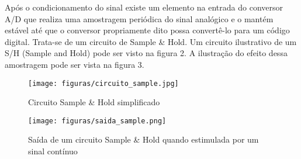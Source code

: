 Após o condicionamento do sinal existe um elemento na entrada do conversor A/D que realiza uma amostragem periódica do sinal analógico e o mantém estável até que o conversor propriamente dito possa convertê-lo para um código digital. Trata-se de um circuito de Sample \& Hold. Um circuito ilustrativo de um S/H (Sample and Hold) pode ser visto na figura 2. A ilustração do efeito dessa amostragem pode ser vista na figura 3\cite{braga2013}.

\begin{figure}[H]
	\centering
	\texttt{[image: figuras/circuito\_sample.jpg]}
	\caption{Circuito Sample \& Hold simplificado} \label{circuito_sample}
\end{figure}

\begin{figure}[H]
	\centering
	\texttt{[image: figuras/saida\_sample.png]}
	\caption{Saída de um circuito Sample \& Hold quando estimulada por um sinal contínuo} \label{saida_sample}
\end{figure}

